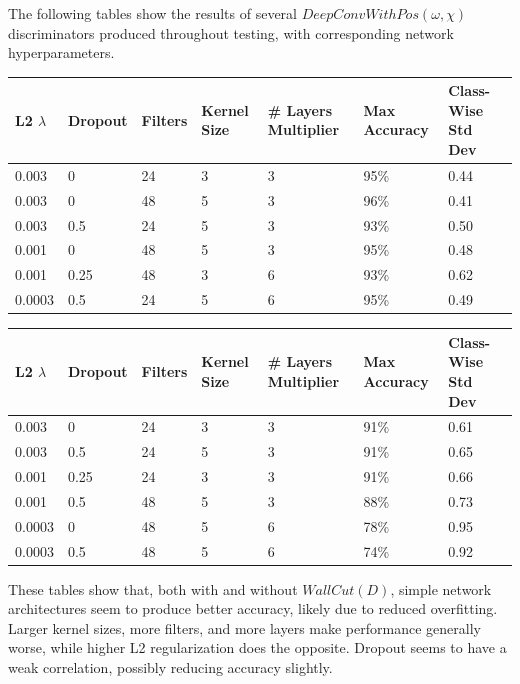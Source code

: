 \documentclass[10pt]{article}
\begin{document}
The following tables show the results of several $DeepConvWithPos(\omega, \chi)$ discriminators produced throughout testing, with corresponding network hyperparameters.

\begin{center}
    \begin{tabular}{|l|l|l|l|l|l|l|}
        \hline
        L2 $\lambda$ & Dropout & Filters & Kernel Size & \# Layers Multiplier & Max Accuracy & Class-Wise Std Dev \\
        \hline
        0.003 & 0 & 24 & 3 & 3 & 95\% & 0.44 \\
        \hline
        0.003 & 0 & 48 & 5 & 3 & 96\% & 0.41 \\
        \hline
        0.003 & 0.5 & 24 & 5 & 3 & 93\% & 0.50 \\
        \hline
        0.001 & 0 & 48 & 5 & 3 & 95\% & 0.48 \\
        \hline
        0.001 & 0.25 & 48 & 3 & 6 & 93\% & 0.62 \\
        \hline
        0.0003 & 0.5 & 24 & 5 & 6 & 95\% & 0.49 \\
        \hline
    \end{tabular}

    \begin{tabular}{|l|l|l|l|l|l|l|}
        \hline
        L2 $\lambda$ & Dropout & Filters & Kernel Size & \# Layers Multiplier & Max Accuracy & Class-Wise Std Dev \\
        \hline
        0.003 & 0 & 24 & 3 & 3 & 91\% & 0.61 \\
        \hline
        0.003 & 0.5 & 24 & 5 & 3 & 91\% & 0.65 \\
        \hline
        0.001 & 0.25 & 24 & 3 & 3 & 91\% & 0.66 \\
        \hline
        0.001 & 0.5 & 48 & 5 & 3 & 88\% & 0.73 \\
        \hline
        0.0003 & 0 & 48 & 5 & 6 & 78\% & 0.95 \\
        \hline
        0.0003 & 0.5 & 48 & 5 & 6 & 74\% & 0.92 \\
        \hline
    \end{tabular}
\end{center}

These tables show that, both with and without $WallCut(D)$, simple network architectures seem to produce better accuracy, likely due to reduced overfitting. Larger kernel sizes, more filters, and more layers make performance generally worse, while higher L2 regularization does the opposite. Dropout seems to have a weak correlation, possibly reducing accuracy slightly.
\end{document}
